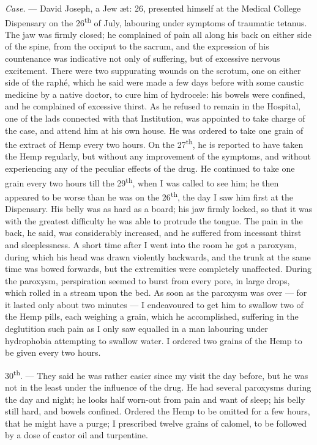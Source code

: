 \documentclass[a4paper, 11pt, oneside, polutonikogreek, english]{article}
\begin{document}
\emph{Case.} --- David Joseph, a Jew æt: 26, presented himself at the Medical College Dispensary on the 26\textsuperscript{th} of July, labouring under symptoms of traumatic tetanus. The jaw was firmly closed; he complained of pain all along his back on either side of the spine, from the occiput to the sacrum, and the expression of his countenance was indicative not only of suffering, but of excessive nervous excitement. There were two suppurating wounds on the scrotum, one on either side of the raphé, which he said were made a few days before with some caustic medicine by a native doctor, to cure him of hydrocele: his bowels were confined, and he complained of excessive thirst. As he refused to remain in the Hospital, one of the lads connected with that Institution, was appointed to take charge of the case, and attend him at his own house. He was ordered to take one grain of the extract of Hemp every two hours. On the 27\textsuperscript{th}, he is reported to have taken the Hemp regularly, but without any improvement of the symptoms, and without experiencing any of the peculiar effects of the drug. He continued to take one grain every two hours till the 29\textsuperscript{th}, when I was called to see him; he then appeared to be worse than he was on the 26\textsuperscript{th}, the day I saw him first at the Dispensary. His belly was as hard as a board; his jaw firmly locked, so that it was with the greatest difficulty he was able to protrude the tongue. The pain in the back, he said, was considerably increased, and he suffered from incessant thirst and sleeplessness. A short time after I went into the room he got a paroxysm, during which his head was drawn violently backwards, and the trunk at the same time was bowed forwards, but the extremities were completely unaffected. During the paroxysm, perspiration seemed to burst from every pore, in large drops, which rolled in a stream upon the bed. As soon as the paroxysm was over --- for it lasted only about two minutes --- I endeavoured to get him to swallow two of the Hemp pills, each weighing a grain, which he accomplished, suffering in the deglutition such pain as I only saw equalled in a man labouring under hydrophobia attempting to swallow water. I ordered two grains of the Hemp to be given every two hours.

30\textsuperscript{th}. --- They said he was rather easier since my visit the day before, but he was not in the least under the influence of the drug. He had several paroxysms during the day and night; he looks half worn-out from pain and want of sleep; his belly still hard, and bowels confined. Ordered the Hemp to be omitted for a few hours, that he might have a purge; I prescribed twelve grains of calomel, to be followed by a dose of castor oil and turpentine.
\end{document}
